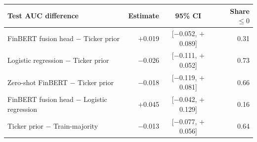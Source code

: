 \begin{tabular}{lrcr}
\toprule
Test AUC difference & Estimate & 95\% CI & Share $\le 0$ \\
\midrule
FinBERT fusion head $-$ Ticker prior & $+$0.019 & [$-$0.052, $+$0.089] & 0.31 \\
Logistic regression $-$ Ticker prior & $-$0.026 & [$-$0.111, $+$0.052] & 0.73 \\
Zero-shot FinBERT $-$ Ticker prior & $-$0.018 & [$-$0.119, $+$0.081] & 0.66 \\
FinBERT fusion head $-$ Logistic regression & $+$0.045 & [$-$0.042, $+$0.129] & 0.16 \\
Ticker prior $-$ Train-majority & $-$0.013 & [$-$0.077, $+$0.056] & 0.64 \\
\bottomrule
\end{tabular}
